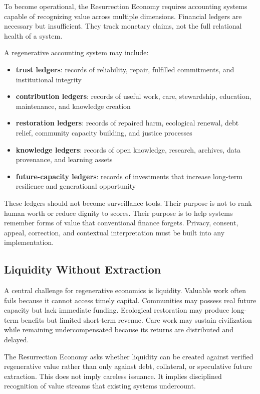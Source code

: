 \documentclass[12pt]{article}
\begin{document}
To become operational, the Resurrection Economy requires accounting systems capable of recognizing value across multiple dimensions. Financial ledgers are necessary but insufficient. They track monetary claims, not the full relational health of a system.

A regenerative accounting system may include:

\begin{itemize}
  \item \textbf{trust ledgers}: records of reliability, repair, fulfilled commitments, and institutional integrity
  \item \textbf{contribution ledgers}: records of useful work, care, stewardship, education, maintenance, and knowledge creation
  \item \textbf{restoration ledgers}: records of repaired harm, ecological renewal, debt relief, community capacity building, and justice processes
  \item \textbf{knowledge ledgers}: records of open knowledge, research, archives, data provenance, and learning assets
  \item \textbf{future-capacity ledgers}: records of investments that increase long-term resilience and generational opportunity
\end{itemize}

These ledgers should not become surveillance tools. Their purpose is not to rank human worth or reduce dignity to scores. Their purpose is to help systems remember forms of value that conventional finance forgets. Privacy, consent, appeal, correction, and contextual interpretation must be built into any implementation.

\subsection{Liquidity Without Extraction}

A central challenge for regenerative economics is liquidity. Valuable work often fails because it cannot access timely capital. Communities may possess real future capacity but lack immediate funding. Ecological restoration may produce long-term benefits but limited short-term revenue. Care work may sustain civilization while remaining undercompensated because its returns are distributed and delayed.

The Resurrection Economy asks whether liquidity can be created against verified regenerative value rather than only against debt, collateral, or speculative future extraction. This does not imply careless issuance. It implies disciplined recognition of value streams that existing systems undercount.
\end{document}
